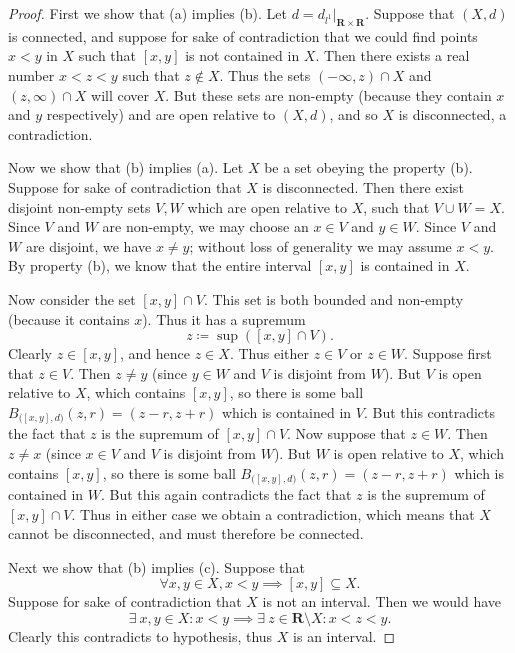 \begin{proof}
    First we show that (a) implies (b).
    Let \(d = d_{l^1}|_{\mathbf{R} \times \mathbf{R}}\).
    Suppose that \((X, d)\) is connected, and suppose for sake of contradiction that we could find points \(x < y\) in \(X\) such that \([x, y]\) is not contained in \(X\).
    Then there exists a real number \(x < z < y\) such that \(z \notin X\).
    Thus the sets \((-\infty, z) \cap X\) and \((z, \infty) \cap X\) will cover \(X\).
    But these sets are non-empty (because they contain \(x\) and \(y\) respectively) and are open relative to \((X, d)\), and so \(X\) is disconnected, a contradiction.

    Now we show that (b) implies (a).
    Let \(X\) be a set obeying the property (b).
    Suppose for sake of contradiction that \(X\) is disconnected.
    Then there exist disjoint non-empty sets \(V , W\) which are open relative to \(X\), such that \(V \cup W = X\).
    Since \(V\) and \(W\) are non-empty, we may choose an \(x \in V\) and \(y \in W\).
    Since \(V\) and \(W\) are disjoint, we have \(x \neq y\);
    without loss of generality we may assume \(x < y\).
    By property (b), we know that the entire interval \([x, y]\) is contained in \(X\).

    Now consider the set \([x, y] \cap V\).
    This set is both bounded and non-empty (because it contains \(x\)).
    Thus it has a supremum
    \[
        z \coloneqq \sup([x, y] \cap V).
    \]
    Clearly \(z \in [x, y]\), and hence \(z \in X\).
    Thus either \(z \in V\) or \(z \in W\).
    Suppose first that \(z \in V\).
    Then \(z \neq y\) (since \(y \in W\) and \(V\) is disjoint from \(W\)).
    But \(V\) is open relative to \(X\), which contains \([x, y]\), so there is some ball \(B_{\big([x,y], d\big)}(z, r) = (z - r, z + r)\) which is contained in \(V\).
    But this contradicts the fact that \(z\) is the supremum of \([x, y] \cap V\).
    Now suppose that \(z \in W\).
    Then \(z \neq x\) (since \(x \in V\) and \(V\) is disjoint from \(W\)).
    But \(W\) is open relative to \(X\), which contains \([x, y]\), so there is some ball \(B_{\big([x,y], d\big)}(z, r) = (z - r, z + r)\) which is contained in \(W\).
    But this again contradicts the fact that \(z\) is the supremum of \([x, y] \cap V\).
    Thus in either case we obtain a contradiction, which means that \(X\) cannot be disconnected, and must therefore be connected.

    Next we show that (b) implies (c).
    Suppose that
    \[
        \forall x, y \in X, x < y \implies [x, y] \subseteq X.
    \]
    Suppose for sake of contradiction that \(X\) is not an interval.
    Then we would have
    \[
        \exists\ x, y \in X : x < y \implies \exists\ z \in \mathbf{R} \setminus X : x < z < y.
    \]
    Clearly this contradicts to hypothesis, thus \(X\) is an interval.


\end{proof}
